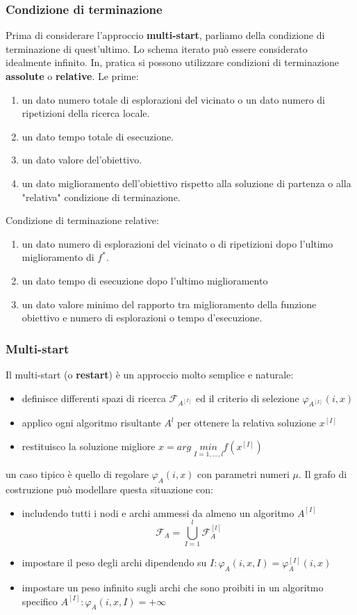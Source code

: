 \documentclass{article}
\begin{document}
\subsubsection{Condizione di terminazione}
Prima di considerare l'approccio \textbf{multi-start}, parliamo della condizione di terminazione di quest'ultimo.
Lo schema iterato può essere considerato idealmente infinito. In, pratica si possono utilizzare
condizioni di terminazione \textbf{assolute} o \textbf{relative}. Le prime:
\begin{enumerate}
    \item un dato numero totale di esplorazioni del vicinato o un dato numero di ripetizioni della ricerca
    locale.
    \item un dato tempo totale di esecuzione.
    \item un dato valore del'obiettivo.
    \item un dato miglioramento dell'obiettivo rispetto alla soluzione di partenza o alla "relativa"
    condizione di terminazione.
\end{enumerate}
Condizione di terminazione relative:
\begin{enumerate}
    \item un dato numero di esplorazioni del vicinato o di ripetizioni dopo l'ultimo miglioramento di
    $f^*$.
    \item un dato tempo di esecuzione dopo l'ultimo miglioramento
    \item un dato valore minimo del rapporto tra miglioramento della funzione obiettivo e numero di
    esplorazioni o tempo d'esecuzione.
\end{enumerate}

\subsubsection{Multi-start}
Il multi-start (o \textbf{restart}) è un approccio molto semplice e naturale:
\begin{itemize}
    \item definisce differenti spazi di ricerca $\mathcal{F}_{A^{[I]}}$ ed il criterio
    di selezione $\varphi_{A^{[I]}}(i,x)$
    \item applico ogni algoritmo risultante $A^{{l}}$ per ottenere la relativa soluzione $x^{[I]}$
    \item restituisco la soluzione migliore $x= arg\;\underset{I=1,\dots,l}{min}f\left(x^{[I]}\right)$
\end{itemize}
un caso tipico è quello di regolare $\varphi_A(i,x)$ con parametri numeri $\mu$. Il grafo di costruzione
può modellare questa situazione con:
\begin{itemize}
    \item includendo tutti i nodi e archi ammessi da almeno un algoritmo $A^{[I]}$
    $$\mathcal{F}_A=\bigcup_{I=1}^l \mathcal{F}_A^{[l]}$$
    \item impostare il peso degli archi dipendendo su $I:\varphi_A(i,x,I)=\varphi_A^{[I]}(i,x)$
    \item impostare un peso infinito sugli archi che sono proibiti in un algoritmo specifico
    $A^{[I]}:\varphi_A(i,x,I)=+\infty$
\end{itemize}
\end{document}
